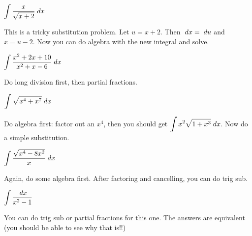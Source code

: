 \documentclass{ximera}
\newcommand{\du}{\; du}
\begin{document}
\begin{problem}
$\displaystyle \int \displaystyle\frac{x}{\sqrt{x + 2}} \; dx$
\begin{multipleChoice}
\end{multipleChoice}
\begin{feedback}[correct]
This is a tricky substitution problem. Let $u=x+2$. Then $\dx = \du$ and $x = u-2$. Now you can do algebra with the new integral and solve.
\end{feedback}
\end{problem}
\begin{problem}
$\displaystyle \int \displaystyle\frac{x^2 + 2x + 10}{x^2 + x - 6} \; dx$
\begin{multipleChoice}
\end{multipleChoice}
\begin{feedback}[correct]
 Do long division first, then partial fractions.
\end{feedback}
\end{problem}
\begin{problem}
$ \displaystyle \int \sqrt{x^4 + x^7} \; dx$
\begin{multipleChoice}
\end{multipleChoice}
\begin{feedback}[correct]
Do algebra first: factor out an $x^4$, then you should get $\displaystyle \int x^2\sqrt{1+x^3} \; dx$. Now do a simple substitution.
\end{feedback}
\end{problem}
\begin{problem}
$\displaystyle \int \displaystyle\frac{\sqrt{x^4 - 8x^2}}{x} \; dx$
\begin{multipleChoice}
\end{multipleChoice}
\begin{feedback}[correct]
Again, do some algebra first. After factoring and cancelling, you can do trig sub.
\end{feedback}
\end{problem}
\begin{problem}
$\displaystyle \int \displaystyle\frac{\; dx}{x^2-1}$
\begin{multipleChoice}
\end{multipleChoice}
\begin{feedback}[correct]
You can do trig sub or partial fractions for this one. The answers are equivalent (you should be able to see why that is!!)
\end{feedback}
\end{problem}
\end{document}
